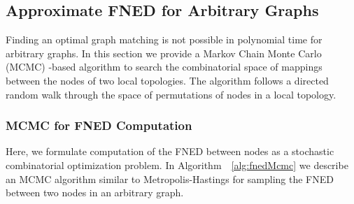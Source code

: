 \documentclass[10pt,twocolumn,fleqn]{article}
\begin{document}


\subsection{Approximate FNED for Arbitrary Graphs}

Finding an optimal graph matching is not possible in polynomial time for arbitrary graphs. In this section we provide a Markov Chain Monte Carlo (MCMC) -based algorithm to search the combinatorial space of mappings between the nodes of two local topologies. The algorithm follows a directed random walk through the space of permutations of nodes in a local topology.


\subsubsection{MCMC for FNED Computation}
Here, we formulate computation of the FNED between nodes as a stochastic combinatorial optimization problem. In Algorithm~~\ref{alg:fnedMcmc} we describe an MCMC algorithm similar to Metropolis-Hastings for sampling the FNED between two nodes in an arbitrary graph.
\end{document}
